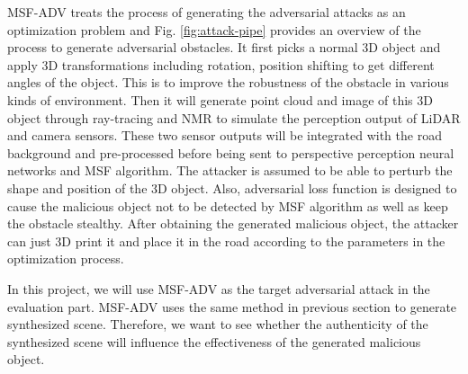 MSF-ADV\cite{msf-adv} treats the process of generating the adversarial attacks as an optimization problem and Fig. \ref{fig:attack-pipe} provides an overview of the process to generate adversarial obstacles. 
It first picks a normal 3D object and apply 3D transformations including rotation, position shifting to get different angles of the object.
This is to improve the robustness of the obstacle in various kinds of environment.
Then it will generate point cloud and image of this 3D object through ray-tracing\cite{ray-tracing} and NMR\cite{nmr} to simulate the perception output of LiDAR and camera sensors.
These two sensor outputs will be integrated with the road background and pre-processed before being sent to perspective perception neural networks and MSF algorithm.
The attacker is assumed to be able to perturb the shape and position of the 3D object.
Also, adversarial loss function is designed to cause the malicious object not to be detected by MSF algorithm as well as keep the obstacle stealthy.
After obtaining the generated malicious object, the attacker can just 3D print it and place it in the road according to the parameters in the optimization process.

In this project, we will use MSF-ADV\cite{msf-adv} as the target adversarial attack in the evaluation part.
MSF-ADV\cite{msf-adv} uses the same method in previous section to generate synthesized scene. 
Therefore, we want to see whether the authenticity of the synthesized scene will influence the effectiveness of the generated malicious object.




